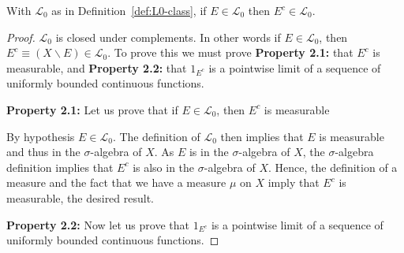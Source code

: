 \begin{proposition}
    \label{prpstn:L0-complement}
    \leanok
    With $\mathcal{L}_0$ as in Definition~\ref{def:L0-class}, if $E \in \mathcal{L}_0$ then $E^c \in \mathcal{L}_0$.
\end{proposition}
\begin{proof}
    \leanok
$\mathcal{L}_0$ is closed under complements. In other words if $E \in \mathcal{L}_0$, then $E^c \equiv (X \backslash E) \in \mathcal{L}_0$. To prove this we must prove \textbf{Property 2.1:} that $E^c$ is measurable, and \textbf{Property 2.2:} that $1_{E^c}$ is a pointwise limit of a sequence of uniformly bounded continuous functions.

\textbf{Property 2.1:} Let us prove that if $E \in \mathcal{L}_0$, then $E^c$ is measurable

By hypothesis $E \in \mathcal{L}_0$. The definition of $\mathcal{L}_0$ then implies that $E$ is measurable and thus in the $\sigma$-algebra of $X$. As $E$ is in the $\sigma$-algebra of $X$, the $\sigma$-algebra definition implies that $E^c$ is also in the $\sigma$-algebra of $X$. Hence, the definition of a measure and the fact that we have a measure $\mu$ on $X$ imply that $E^c$ is measurable, the desired result. 

\textbf{Property 2.2:} Now let us prove that $1_{E^c}$ is a pointwise limit of a sequence of uniformly bounded continuous functions.


\end{proof}
